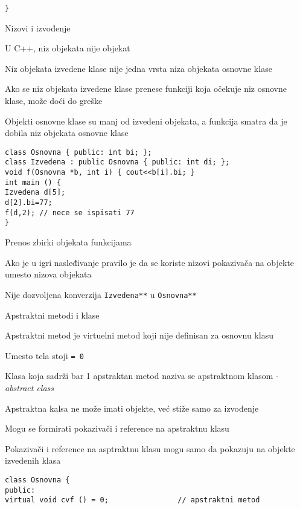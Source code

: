 \documentclass{article}
\newenvironment{xitemize}{%
    
    \itemize
    \larger
}{%
    \enditemize
}
\let\olditemize\itemize
\let\endolditemize\enditemize
\renewenvironment{itemize}{%
    \smaller
    \olditemize
}{%
    \endolditemize
}
\providecommand{\inlinecode}[1]{\texttt{#1}}
\begin{document}
\begin{xitemize}
\begin{itemize}
\begin{lstlisting}
}
    \end{lstlisting}
\end{itemize}
\item Nizovi i izvođenje
\begin{itemize}
    \item U C++, niz objekata nije objekat
    \item Niz objekata izvedene klase nije jedna vrsta niza objekata osnovne klase
    \item Ako se niz objekata izvedene klase prenese funkciji koja očekuje niz osnovne klase, može doći do greške
    \item Objekti osnovne klase su manj od izvedeni objekata, a funkcija smatra da je dobila niz objekata osnovne klase
    \begin{lstlisting}
class Osnovna { public: int bi; };
class Izvedena : public Osnovna { public: int di; };
void f(Osnovna *b, int i) { cout<<b[i].bi; }
int main () {
Izvedena d[5];
d[2].bi=77;
f(d,2); // nece se ispisati 77
}
    \end{lstlisting}
\end{itemize}
\item Prenos zbirki objekata funkcijama
\begin{itemize}
    \item Ako je u igri nasleđivanje pravilo je da se koriste nizovi pokazivača na objekte umesto nizova objekata
    \item Nije dozvoljena konverzija \inlinecode{Izvedena**} u \inlinecode{Osnovna**}
\end{itemize}
\item Apstraktni metodi i klase
\begin{itemize}
    \item Apstraktni metod je virtuelni metod koji nije definisan za osnovnu klasu
    \item Umesto tela stoji \inlinecode{= 0}
    \item Klasa koja sadrži bar 1 apstraktan metod naziva se apstraktnom klasom - \textit{abstract class}
    \item Apstraktna kalsa ne može imati objekte, već stiže samo za izvođenje
    \item Mogu se formirati pokazivači i reference na apstraktnu klasu
    \item Pokazivači i reference na asptraktnu klasu mogu samo da pokazuju na objekte izvedenih klasa
    \begin{lstlisting}
class Osnovna {
public:
virtual void cvf () = 0;                // apstraktni metod

\end{lstlisting}
\end{itemize}
\end{xitemize}
\end{document}
